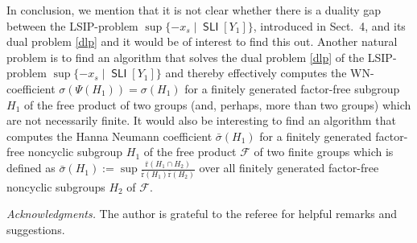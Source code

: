 \documentclass[10pt, reqno]{amsart}
\numberwithin{equation}{section}
\begin{document}
In conclusion, we mention that it is not clear whether there is a duality gap between
the LSIP-problem $ \sup \{ - x_s \mid \operatorname{\textsf{SLI}}[Y_1] \}$, introduced in Sect.~4, and its dual problem \eqref{dlp} and
it would be of interest to find this out. Another natural problem
is to find an algorithm that solves the dual  problem  \eqref{dlp} of the LSIP-problem $ \sup \{ - x_s \mid \operatorname{\textsf{SLI}}[Y_1] \}$
and thereby effectively  computes the WN-coefficient $\sigma(\Psi(H_1)) =  \sigma(H_1)$ for a finitely generated factor-free subgroup $ H_1$ of the free product of two groups (and, perhaps, more than two groups) which are not necessarily finite.  It would also be interesting to find an algorithm  that computes the Hanna Neumann coefficient $\bar \sigma(H_1)$ for a finitely  generated factor-free noncyclic subgroup $ H_1$ of the free product ${\mathcal{F}}$ of two finite groups which is defined as
$
\bar \sigma(H_1) := \sup \tfrac {{\bar {\mathrm{r}}}(H_1 \cap H_2)} {{\bar {\mathrm{r}}}(H_1) {\bar {\mathrm{r}}}(H_2)}
$
over all finitely  generated factor-free noncyclic subgroups $H_2$ of ${\mathcal{F}}$.
\medskip

{\em Acknowledgments.}  The author is grateful to the referee for helpful remarks and suggestions.
\end{document}
